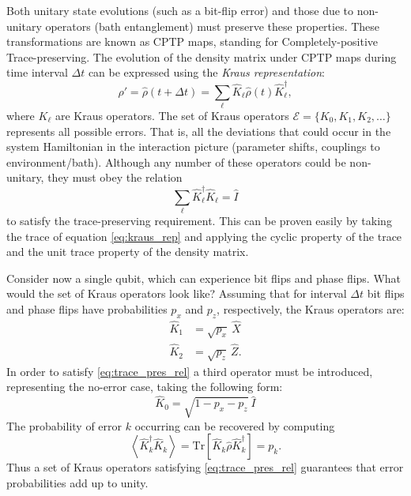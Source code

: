 Both unitary state evolutions (such as a bit-flip error) and those due to non-unitary operators (bath entanglement) must preserve these properties. These transformations are known as CPTP maps, standing for Completely-positive Trace-preserving. The evolution of the density matrix under CPTP maps during time interval $\Delta t$ can be expressed using the \textit{Kraus representation}:
\begin{equation}
    \hat\rho'=\hat\rho(t+\Delta t)= \sum_\ell \hat K_\ell \hat\rho(t) \hat K_\ell^\dagger,
    \label{eq:kraus_rep}
\end{equation}
where $K_\ell$ are Kraus operators\cite{Girvin2021}. The set of Kraus operators $\mathcal{E}=\{ K_0,K_1,K_2,\dots\}$ represents all possible errors. That is, all the deviations that could occur in the system Hamiltonian in the interaction picture (parameter shifts, couplings to environment/bath). Although any number of these operators could be non-unitary, they must obey the relation 
\begin{equation}
    \sum_\ell \hat K_\ell^\dagger \hat K_\ell = \hat I
    \label{eq:trace_pres_rel}
\end{equation} 
to satisfy the trace-preserving requirement. This can be proven easily by taking the trace of equation \eqref{eq:kraus_rep} and applying the cyclic property of the trace and the unit trace property of the density matrix.

Consider now a single qubit, which can experience bit flips and phase flips. What would the set of Kraus operators look like? Assuming that for interval $\Delta t$ bit flips and phase flips have probabilities $p_x$ and $p_z$, respectively, the Kraus operators are:
\begin{eqnarray}
    \hat K_1 &= \sqrt{p_x}\ \hat X \\
    \hat K_2 &= \sqrt{p_z}\ \hat Z.
\end{eqnarray}
In order to satisfy \eqref{eq:trace_pres_rel} a third operator must be introduced, representing the no-error case, taking the following form:
\begin{equation}
    \hat K_0 = \sqrt{1-p_x-p_z}\ \hat I
\end{equation}
The probability of error $k$ occurring can be recovered by computing
\begin{equation}
    \left<\hat K_k^\dagger \hat K_k\right> = \mathrm{Tr}\left[\hat K_k \hat\rho \hat K_k^\dagger\right] = p_k.
\end{equation}
Thus a set of Kraus operators satisfying \eqref{eq:trace_pres_rel} guarantees that error probabilities add up to unity.


